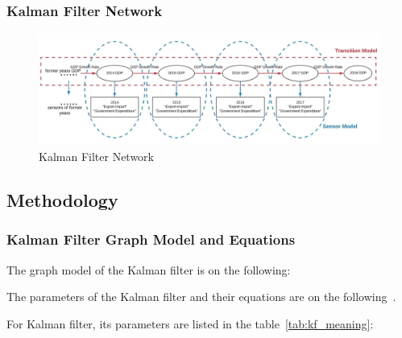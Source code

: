 \documentclass[11pt, a4paper]{article}
\begin{document}
\subsubsection{Kalman Filter Network}

\begin{figure}[htbp]
	
	\centering 
	\includegraphics[width=13cm]{graph}
	
	\caption{Kalman Filter Network}
	\label{fig:network}
	
\end{figure}


\subsection{Methodology}

\subsubsection{Kalman Filter Graph Model and Equations}
The graph model of the Kalman filter is on the following:



The parameters of the Kalman filter and their equations are on the following~\cite{ref:kf}.

\newpage

For Kalman filter, its parameters are listed in the table~\ref{tab:kf_meaning}:
\end{document}
